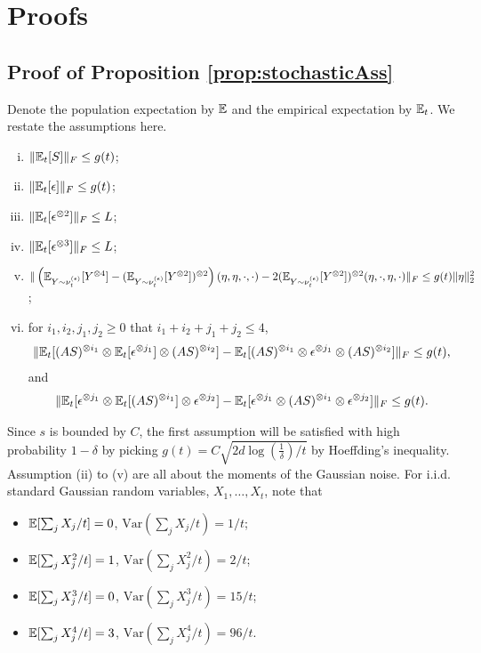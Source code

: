 \onecolumn
\appendix

\section{Proofs}
\label{sec:Appendix}
\subsection{Proof of Proposition \ref{prop:stochasticAss}}
Denote the population expectation by $\mathbb{E}$ and the empirical expectation by $\mathbb{E}_t$. We restate the assumptions here.
\begin{enumerate}[(i).]
\item $\| \mathbb{E}_t[S] \|_F\le g(t)$;
\item $\| \mathbb{E}_t[\epsilon] \|_F \le  g(t)$;
\item $\| \mathbb{E}_t[\epsilon^{\otimes 2}] \|_F \le L$;
\item $\| \mathbb{E}_t[\epsilon^{\otimes 3}] \|_F \le L$;
\item $\| \left(\mathbb{E}_{Y\sim \nu_t^{(\epsilon)}} [Y^{\otimes4}] - (\mathbb{E}_{Y\sim \nu_t^{(\epsilon)}} [Y^{\otimes2}])^{\otimes 2}\right)(\eta,\eta,\cdot,\cdot)  - 2 (\mathbb{E}_{Y\sim \nu_t^{(\epsilon)}} [Y^{\otimes2}])^{\otimes 2}(\eta,\cdot,\eta,\cdot)\|_F\le  g(t) \|\eta\|_2^2$;
\item for $i_1,i_2,j_1,j_2 \ge 0$ that $i_1+i_2+j_1+j_2 \le 4$,  
\begin{align*}
\| \mathbb{E}_t[(AS)^{\otimes i_1} \otimes \mathbb{E}_t[\epsilon^{\otimes j_1}] \otimes (AS)^{\otimes i_2}] - \mathbb{E}_t[(AS)^{\otimes i_1}\otimes \epsilon^{\otimes j_1}\otimes (AS)^{\otimes i_2}]  \|_F \le  g(t),
\end{align*}
and 
\begin{align*}
\| \mathbb{E}_t[\epsilon^{\otimes j_1} \otimes \mathbb{E}_t[(AS)^{\otimes i_1}] \otimes \epsilon^{\otimes j_2}] - \mathbb{E}_t[ \epsilon^{\otimes j_1}\otimes (AS)^{\otimes i_1}\otimes \epsilon^{\otimes j_2}]  \|_F \le  g(t).
\end{align*}
\end{enumerate}
Since $s$ is bounded by $C$, the first assumption will be satisfied with high probability $1-\delta$ by picking $g(t) = C\sqrt{2d\log(\frac{1}{\delta})/t}$ by Hoeffding's inequality. Assumption (ii) to (v) are all about the moments of the Gaussian noise. 
For i.i.d. standard Gaussian random variables, $X_1, \ldots, X_t$, note that
\begin{itemize}
\item $ \mathbb{E}[\sum_j X_j/t] = 0$, $\text{Var}(\sum_j X_j/t) = 1/t$;
\item $ \mathbb{E}[\sum_j X_j^2/t] = 1$, $\text{Var}(\sum_j X_j^2/t) = 2/t$;
\item $ \mathbb{E}[\sum_j X_j^3/t] = 0$, $\text{Var}(\sum_j X_j^3/t) = 15/t$;
\item $ \mathbb{E}[\sum_j X_j^4/t] = 3$, $\text{Var}(\sum_j X_j^4/t) = 96/t$.
\end{itemize}
